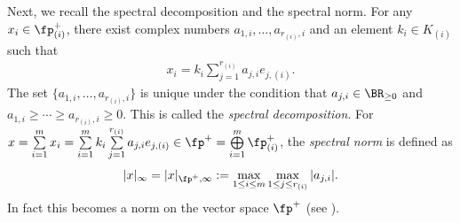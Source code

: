 Next, we recall the spectral decomposition and the spectral norm. For any $x_i\in\fp^+_{(i)}$, there exist complex numbers
$a_{1,i},\ldots, a_{r_{(i)},i}$ and an element $k_i\in K_{(i)}$ such that
\begin{gather*} x_i=k_i\sum_{j=1}^{r_{(i)}} a_{j,i}e_{j,(i)}. \end{gather*}
The set $\{a_{1,i},\ldots,a_{r_{(i)},i}\}$ is unique under the condition that $a_{j,i}\in\BR_{\ge 0}$ and
$a_{1,i}\ge\cdots\ge a_{r_{(i)},i}\ge 0$. This is called the \textit{spectral decomposition}.
For $x=\sum\limits_{i=1}^m x_i=\sum\limits_{i=1}^m k_i\sum\limits_{j=1}^{r_{(i)}}a_{j,i}e_{j,(i)}\in\fp^+=\bigoplus\limits_{i=1}^m \fp^+_{(i)}$,
the \textit{spectral norm} is defined as
\begin{gather}\label{spectral_norm}
|x|_\infty=|x|_{\fp^+,\infty}:=\max_{1\le i\le m}\max_{1\le j\le r_{(i)}}|a_{j,i}|.
\end{gather}
In fact this becomes a norm on the vector space $\fp^+$ (see \cite[Part V, Proposition VI.4.1]{FKKLR}).

